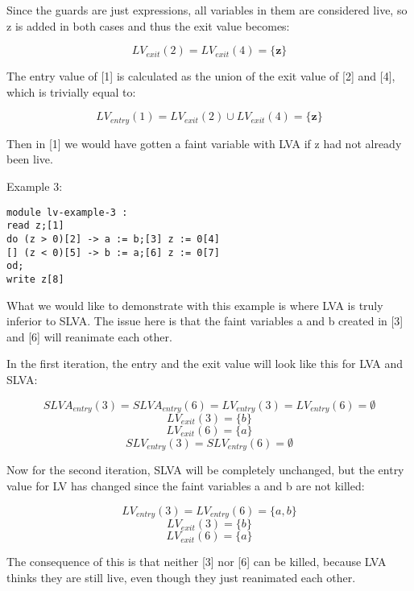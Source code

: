 Since the guards are just expressions, all variables in
them are considered live, so z is added in both cases
and thus the exit value becomes:

\[LV_{exit}(2) = LV_{exit}(4) = \{\textbf{z}\} \]

The entry value of [1] is calculated as the union of
the exit value of [2] and [4], which is trivially
equal to:

\[LV_{entry}(1) = LV_{exit}(2) \cup LV_{exit}(4) = \{\textbf{z}\} \]

Then in [1] we would have gotten a faint variable with LVA if z had
not already been live.


\docpar
Example 3:
\begin{lstlisting}
module lv-example-3 :
read z;[1]
do (z > 0)[2] -> a := b;[3] z := 0[4]
[] (z < 0)[5] -> b := a;[6] z := 0[7]
od;
write z[8]
\end{lstlisting}

What we would like to demonstrate with this example is where LVA is truly
inferior to SLVA. The issue here is that the faint variables a and b created
in [3] and [6] will reanimate each other.

  In the first iteration, the entry and the exit value will look like this
for LVA and SLVA:

\[SLVA_{entry}(3) = SLVA_{entry}(6) = LV_{entry}(3) = LV_{entry}(6) = \emptyset \]
\[LV_{exit}(3) = \{b\} \]
\[LV_{exit}(6) = \{a\} \]
\[SLV_{entry}(3) = SLV_{entry}(6) = \emptyset \]

Now for the second iteration, SLVA will be completely unchanged, but the entry
value for LV has changed since the faint variables a and b are not killed:

\[LV_{entry}(3) = LV_{entry}(6) = \{a, b\} \]
\[LV_{exit}(3) = \{b\} \]
\[LV_{exit}(6) = \{a\} \]

The consequence of this is that neither [3] nor [6] can be killed, because LVA
thinks they are still live, even though they just reanimated each other.

